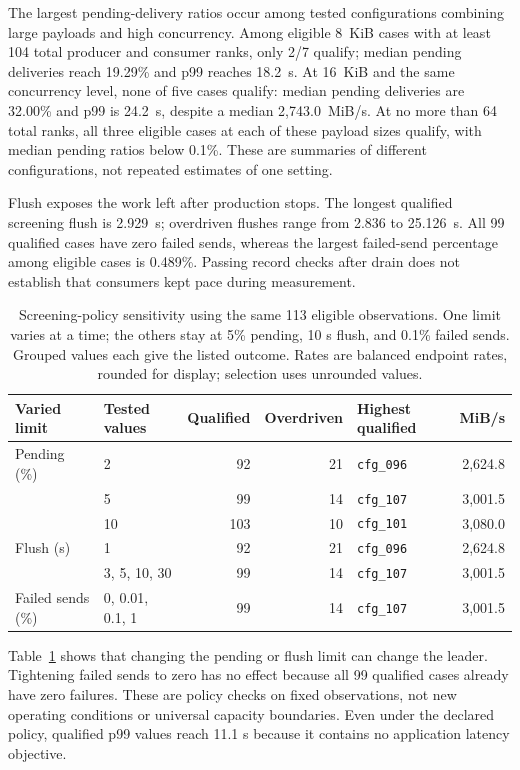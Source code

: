 \documentclass[10pt]{article}
\begin{document}
The largest pending-delivery ratios occur among tested configurations combining
large payloads and high concurrency.
Among eligible 8~KiB cases with at least 104 total producer and consumer ranks,
only 2/7 qualify; median pending deliveries reach 19.29\% and p99 reaches
18.2~s. At 16~KiB and the same concurrency level, none of five cases qualify:
median pending deliveries are 32.00\% and p99 is 24.2~s, despite a median
2,743.0~MiB/s. At no more than 64 total ranks, all three eligible cases at
each of these payload sizes qualify, with median pending ratios below 0.1\%.
These are summaries of different configurations, not repeated estimates of
one setting.

Flush exposes the work left after production stops. The longest qualified
screening flush is 2.929~s; overdriven flushes range from 2.836 to 25.126~s.
All 99 qualified cases have zero failed sends, whereas the largest
failed-send percentage among eligible cases is 0.489\%. Passing record checks
after drain does not establish that consumers kept pace during measurement.

\begin{table}[H]
\centering
\footnotesize
\setlength{\tabcolsep}{6pt}
\begin{tabular}{@{}l l r r l r@{}}
\toprule
Varied limit & Tested values & Qualified & Overdriven & Highest qualified & MiB/s \\
\midrule
Pending (\%) & 2 & 92 & 21 & \texttt{cfg\_096} & 2,624.8 \\
 & 5 & 99 & 14 & \texttt{cfg\_107} & 3,001.5 \\
 & 10 & 103 & 10 & \texttt{cfg\_101} & 3,080.0 \\
\midrule
Flush (s) & 1 & 92 & 21 & \texttt{cfg\_096} & 2,624.8 \\
 & 3, 5, 10, 30 & 99 & 14 & \texttt{cfg\_107} & 3,001.5 \\
\midrule
Failed sends (\%) & 0, 0.01, 0.1, 1 & 99 & 14 & \texttt{cfg\_107} & 3,001.5 \\
\bottomrule
\end{tabular}
\caption{Screening-policy sensitivity using the same 113 eligible observations.
One limit varies at a time; the others stay at 5\% pending, 10 s flush, and 0.1\%
failed sends. Grouped values each give the listed outcome. Rates are balanced
endpoint rates, rounded for display; selection uses unrounded values.}
\label{tab:kafka-backlog-sensitivity}
\end{table}


Table~\ref{tab:kafka-backlog-sensitivity} shows that changing the pending or flush
limit can change the leader. Tightening failed sends to zero has no effect because
all 99 qualified cases already have zero failures. These are policy checks on
fixed observations, not new operating conditions or universal capacity boundaries.
Even under the declared policy, qualified p99 values reach 11.1 s because it
contains no application latency objective.
\end{document}
